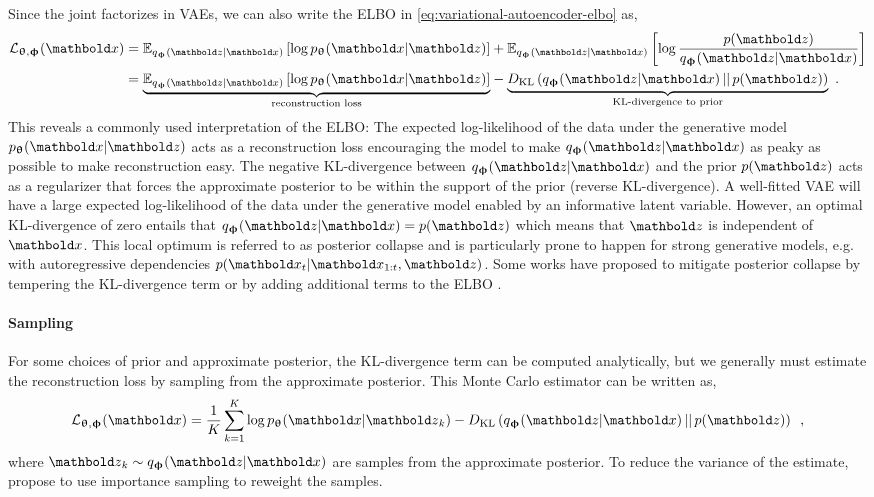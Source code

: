 Since the joint factorizes in VAEs, we can also write the ELBO in \cref{eq:variational-autoencoder-elbo} as,
%
\begin{align} \label{eq:variational-autoencoder-elbo-factorized}
    \mathcal{L}_{\thetab,\phib}(\xb)
    &= \mathbb{E}_{q_\phib(\zb|\xb)}\left[\log p_\thetab(\xb|\zb)\right] + \mathbb{E}_{q_\phib(\zb|\xb)} \left[ \log \frac{p(\zb)}{q_\phib(\zb|\xb)}\right] \nonumber \\
    &= \underset{\text{reconstruction loss}}{\underbrace{\mathbb{E}_{q_\phib(\zb|\xb)}\left[\log p_\thetab(\xb|\zb)\right]}} - \underset{\text{KL-divergence to prior}}{\underbrace{D_\text{KL}\left( q_\phib(\zb|\xb) \,||\, p(\zb) \right)}} \enspace .
\end{align}
%
This reveals a commonly used interpretation of the ELBO: 
The expected log-likelihood of the data under the generative model $p_\thetab(\xb|\zb)$ acts as a reconstruction loss encouraging the model to make $q_\phib(\zb|\xb)$ as peaky as possible to make reconstruction easy. 
The negative KL-divergence between $q_\phib(\zb|\xb)$ and the prior $p(\zb)$ acts as a regularizer that forces the approximate posterior to be within the support of the prior (reverse KL-divergence). 
A well-fitted VAE will have a large expected log-likelihood of the data under the generative model enabled by an informative latent variable. However, an optimal KL-divergence of zero entails that $q_\phib(\zb|\xb) = p(\zb)$ which means that $\zb$ is independent of $\xb$. This local optimum is referred to as posterior collapse and is particularly prone to happen for strong generative models, e.g. with autoregressive dependencies $p(\xb_{t}|\xb_{1:t},\zb)$. Some works have proposed to mitigate posterior collapse by tempering the KL-divergence term \cite{alemi_fixing_2018,higgins_vvae_2017} or by adding additional terms to the ELBO \cite{zhao_infovae_2018}. 


\paragraph{Sampling}
For some choices of prior and approximate posterior, the KL-divergence term can be computed analytically, but we generally must estimate the reconstruction loss by sampling from the approximate posterior. 
This Monte Carlo estimator can be written as,
%
\begin{equation} \label{eq:variational-autoencoder-elbo-sampling}
    \mathcal{L}_{\thetab,\phib}(\xb)
    = \frac{1}{K} \sum_{k=1}^K \log p_\thetab(\xb|\zb_k) - D_\text{KL}\left( q_\phib(\zb|\xb) \,||\, p(\zb) \right) \enspace ,
\end{equation}
%
where $\zb_k \sim q_\phib(\zb|\xb)$ are samples from the approximate posterior. To reduce the variance of the estimate, \textcite{burda_importance_2016} propose to use importance sampling to reweight the samples.


